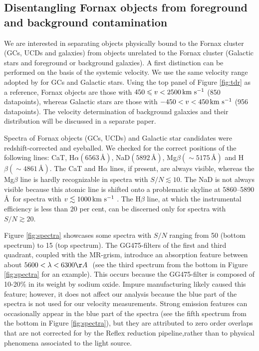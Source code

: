 \documentclass[useAMS,usenatbib]{mn2e}
\newcommand{\kms}{\mbox{\,km~s$^{-1}$}}
\begin{document}
\subsection{Disentangling Fornax objects from foreground and background 
contamination}

We are interested in separating objects physically bound to the Fornax cluster 
(GCs, UCDs and galaxies) from objects unrelated to the Fornax cluster (Galactic 
stars and foreground or background galaxies). A first distinction can be 
performed on the basis of the systemic velocity. We use the same velocity range 
adopted by \cite{Schuberth} for GCs and Galactic stars.
Using the top panel of Figure \ref{fig:tdr} as a reference, Fornax objects are 
those with $450 \le v <2500 \kms$ (850 datapoints), whereas Galactic stars are 
those with $-450<v<450 \kms$ (956 datapoints). The velocity determination of 
background galaxies and their distribution will be discussed in a separate 
paper.

Spectra of Fornax objects (GCs, UCDs) and Galactic star candidates were 
redshift-corrected and eyeballed. We checked for the correct positions of the 
following lines: CaT, H$\alpha (6563 \, \mbox{\AA})$, NaD$(5892 \, 
\mbox{\AA})$, Mg$\beta (\sim 5175 \, \mbox{\AA})$ and H$\beta (\sim 4861\, 
\mbox{\AA})$. The CaT and H$\alpha$ lines, if present, are always visible, 
whereas the Mg$\beta$ line is hardly recognizable in spectra with $S/N \lesssim 
10$. The NaD is not always visible because this atomic line is shifted onto a 
problematic skyline at 5860--5890 \AA\ for spectra with $v \lesssim 1000\kms$ . 
The H$\beta$ line, at which the instrumental efficiency is less than $20$ per 
cent, can be discerned only for spectra with $S/N \gtrsim 20 $.

Figure \ref{fig:spectra} showcases some spectra with $S/N$ ranging from 50 
(bottom spectrum) to 15 (top spectrum). 
The GG475-filters of the first and third quadrant, coupled with the MR-grism, 
introduce an absorption feature between about $5600 < \lambda < 6300 \AA\ $ 
(see the third spectrum from the bottom in Figure \ref{fig:spectra} for an 
example). This occurs because the GG475-filter is composed of 10-20\% in its 
weight by sodium oxide. Impure manufacturing likely caused this feature; 
however, it does not affect our analysis because the blue part of the spectra 
is not used for our velocity measurements. Strong emission features can 
occasionally appear in the blue part of the spectra (see the fifth spectrum 
from the bottom in Figure \ref{fig:spectra}), but they are attributed to zero 
order overlaps that are not corrected for by the Reflex reduction 
pipeline,rather than to physical phenomena associated to the light source. 
\end{document}
